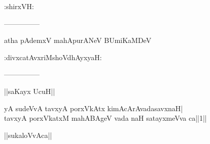 \documentclass{article}
\begin{document}
\begin{center}
:shirxVH:
\end{center}

\begin{center}
---------------
\end{center}

\begin{center}
atha pAdemxV mahApurANeV BUmiKaMDeV
\end{center}

\begin{center}
:divxcatAvxriMshoVdhAyxyaH:
\end{center}

\begin{center}
---------------
\end{center}

\begin{center}
||saKayx UcuH||
\end{center}

yA sudeVvA tavxyA porxVkAtx kimAcArAvadasavxnaH|\\
tavxyA porxVkatxM mahABAgeV vada naH satayxmeVva ca||1||

\begin{center}
||sukaloVvAca||
\end{center}
\end{document}
